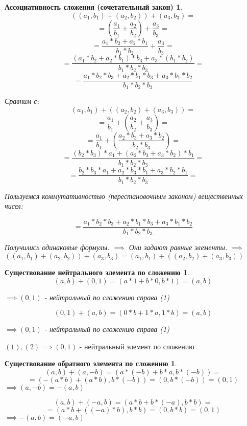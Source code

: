 \documentclass[14pt,a4paper,oneside,russian]{article}
\newtheorem*{axiom1}{Ассоциативность сложения (сочетательный закон)}
\newtheorem*{axiom2}{Существование нейтрального элемента по сложению}
\newtheorem*{axiom3}{Существование обратного элемента по сложению}
\begin{document}
\begin{axiom1}
$$ ((a_1, b_1) + (a_2, b_2)) + (a_3, b_3) = $$
$$ = (\frac{a_1}{b_1} + \frac{a_2}{b_2}) + \frac{a_3}{b_3} = $$
$$ = \frac{a_1 * b_2 + a_2 * b_1}{b_1 * b_2} + \frac{a_3}{b_3} = $$
$$ = \frac{(a_1 * b_2 + a_2 * b_1) * b_3 + a_3 * (b_1 * b_2)}{b_1 * b_2 * b_3} = $$
$$ = \frac{a_1 * b_2 * b_3 + a_2 * b_1 * b_3 + a_3 * b_1 * b_2}{b_1 * b_2 * b_3} $$

Сравним с:
$$ ( a_1, b_1 ) + (( a_2, b_2 ) + ( a_3, b_3 )) = $$
$$ = \frac{a_1}{b_1} + (\frac{a_2}{b_2} + \frac{a_3}{b_3}) = $$
$$ = \frac{a_1}{b_1} + (\frac{a_2 * b_3 + a_3 * b_2}{b_2 * b_3}) = $$
$$ = \frac{(b_2 * b_3) * a_1 + (a_2 * b_3 + a_3 * b_2) * b_1}{b_1 * b_2 * b_3} = $$
$$ = \frac{b_2 * b_3 * a_1 + a_2 * b_3 * b_1 + a_3 * b_2 * b_1}{b_1 * b_2 * b_3} =  $$

Пользуемся коммутативностью (перестановочным законом) вещественных чисел:

$$ = \frac{a_1 * b_2 * b_3 + a_2 * b_1 * b_3 + a_3 * b_1 * b_2}{b_1 * b_2 * b_3} $$

Получились одинаковые формулы. $ \implies $ Они задают равные элементы. $ \implies $
$ ((a_1, b_1) + (a_2, b_2)) + (a_3, b_3) = (a_1, b_1) + ((a_2, b_2) + (a_3, b_3)) $

\end{axiom1}
\newpage

\begin{axiom2}
$$ (a, b) + (0, 1) = (a * 1 + b * 0, b * 1) = (a, b) $$
\begin{center}
$ \implies (0, 1) $ - нейтральный по сложению справа (1)
\end{center}
$$ (0, 1) + (a, b) = (0 * b + 1 * a, 1 * b) = (a, b) $$
\begin{center}
$ \implies (0, 1) $ - нейтральный по сложению справа (1)
\end{center}
\end{axiom2}

$ (1), (2) \implies (0, 1) $ - нейтральный элемент по сложению
\newpage

\begin{axiom3}
$$ (a, b) + (a, -b) = (a * (-b) + b * a, b * (-b)) = $$
$$ = ( -(a * b) + (a * b), b * (-b) ) = (0, b * (-b)) = (0, 1) $$
$ \implies (a, -b) = -(a, b) $

$$ (a, b) + (-a, b) = (a * b + b * (-a), b * b) = $$
$$ = (a * b + ((-a) * b), b * b) = (0, b * b) = (0, 1) $$
$ \implies -(a, b) = (-a, b) $
\end{axiom3}
\newpage
\end{document}
